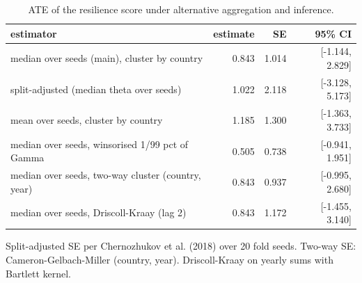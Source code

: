 \begin{table}[htbp]
\centering
\caption{ATE of the resilience score under alternative aggregation and inference.}
\label{tab:agri_inference}
\begin{tabular}{lrrr}
\toprule
estimator & estimate & SE & 95\% CI \\
\midrule
median over seeds (main), cluster by country & 0.843 & 1.014 & [-1.144, 2.829] \\
split-adjusted (median theta over seeds) & 1.022 & 2.118 & [-3.128, 5.173] \\
mean over seeds, cluster by country & 1.185 & 1.300 & [-1.363, 3.733] \\
median over seeds, winsorised 1/99 pct of Gamma & 0.505 & 0.738 & [-0.941, 1.951] \\
median over seeds, two-way cluster (country, year) & 0.843 & 0.937 & [-0.995, 2.680] \\
median over seeds, Driscoll-Kraay (lag 2) & 0.843 & 1.172 & [-1.455, 3.140] \\
\bottomrule
\end{tabular}
\par\smallskip\footnotesize Split-adjusted SE per Chernozhukov et al. (2018) over 20 fold seeds. Two-way SE: Cameron-Gelbach-Miller (country, year). Driscoll-Kraay on yearly sums with Bartlett kernel.
\end{table}
